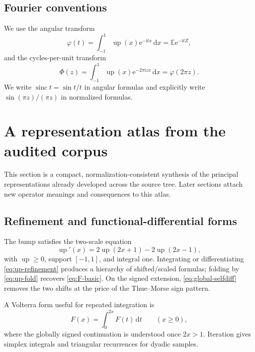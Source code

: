 \documentclass[11pt,oneside]{article}
\theoremstyle{definition}
\newcommand{\dd}{\,\mathrm d}
\newcommand{\e}{\mathrm e}
\newcommand{\ii}{\mathrm i}
\newcommand{\E}{\mathbb E}
\newcommand{\Up}{\operatorname{up}}
\newcommand{\sinc}{\operatorname{sinc}}
\newcommand{\PhiF}{\Phi}
\newcommand{\phiF}{\varphi}
\begin{document}
\subsection{Fourier conventions}

We use the angular transform
\begin{equation}
 \phiF(t)=\int_{-1}^{1}\Up(x)\e^{-\ii tx}\dd x=\E\e^{-\ii tZ},
 \label{eq:angular-transform}
\end{equation}
and the cycles-per-unit transform
\begin{equation}
 \PhiF(z)=\int_{-1}^{1}\Up(x)\e^{-2\pi\ii zx}\dd x=\phiF(2\pi z).
 \label{eq:normalized-transform}
\end{equation}
We write \(\sinc t=\sin t/t\) in angular formulas and explicitly write
\(\sin(\pi z)/(\pi z)\) in normalized formulas.

\section{A representation atlas from the audited corpus}
\label{sec:atlas}

This section is a compact, normalization-consistent synthesis of the principal
representations already developed across the source tree.  Later sections attach new
operator meanings and consequences to this atlas.

\subsection{Refinement and functional-differential forms}

The bump satisfies the two-scale equation
\begin{equation}
 \Up'(x)=2\Up(2x+1)-2\Up(2x-1),
 \label{eq:up-refinement}
\end{equation}
with \(\Up\ge0\), support \([-1,1]\), and integral one.  Integrating or differentiating
\eqref{eq:up-refinement} produces a hierarchy of shifted/scaled formulas; folding by
\eqref{eq:up-fold} recovers \eqref{eq:F-basic}.  On the signed extension,
\eqref{eq:global-selfdiff} removes the two shifts at the price of the Thue--Morse sign
pattern.

A Volterra form useful for repeated integration is
\begin{equation}
 F(x)=\int_0^{2x}F(t)\dd t\qquad(x\ge0),
 \label{eq:volterra-F}
\end{equation}
where the globally signed continuation is understood once \(2x>1\).  Iteration gives
simplex integrals and triangular recurrences for dyadic samples.
\end{document}
